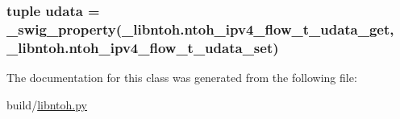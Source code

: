 \hypertarget{classlibntoh_1_1ntoh__ipv4__flow__t_a6900744e840ca75a67e020c38d143891}{
\subsubsection[{udata}]{\setlength{\rightskip}{0pt plus 5cm}tuple udata = {\bf \-\_\-swig\-\_\-property}(\-\_\-libntoh.\-ntoh\-\_\-ipv4\-\_\-flow\-\_\-t\-\_\-udata\-\_\-get, \-\_\-libntoh.\-ntoh\-\_\-ipv4\-\_\-flow\-\_\-t\-\_\-udata\-\_\-set)\hspace{0.3cm}{\ttfamily [static]}}}\label{classlibntoh_1_1ntoh__ipv4__flow__t_a6900744e840ca75a67e020c38d143891}


The documentation for this class was generated from the following file\-:\begin{DoxyCompactItemize}
\item 
build/\hyperlink{libntoh_8py}{libntoh.\-py}\end{DoxyCompactItemize}

